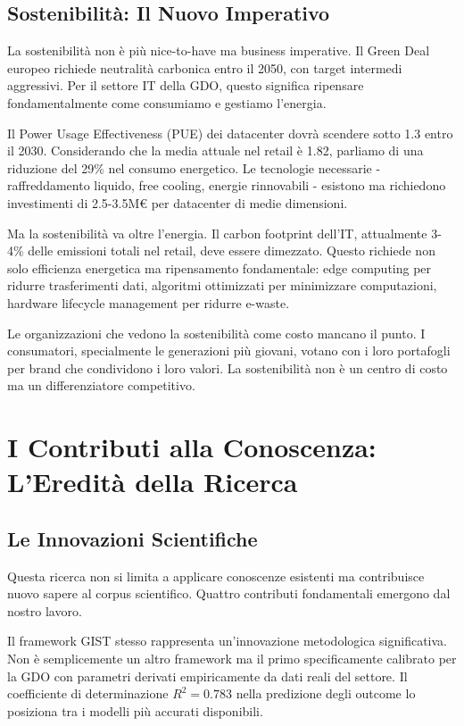 \subsection{Sostenibilità: Il Nuovo Imperativo}

La sostenibilità non è più nice-to-have ma business imperative. Il Green Deal europeo richiede neutralità carbonica entro il 2050, con target intermedi aggressivi. Per il settore IT della GDO, questo significa ripensare fondamentalmente come consumiamo e gestiamo l'energia.

Il Power Usage Effectiveness (PUE) dei datacenter dovrà scendere sotto 1.3 entro il 2030. Considerando che la media attuale nel retail è 1.82, parliamo di una riduzione del 29\% nel consumo energetico. Le tecnologie necessarie - raffreddamento liquido, free cooling, energie rinnovabili - esistono ma richiedono investimenti di 2.5-3.5M€ per datacenter di medie dimensioni.

Ma la sostenibilità va oltre l'energia. Il carbon footprint dell'IT, attualmente 3-4\% delle emissioni totali nel retail, deve essere dimezzato. Questo richiede non solo efficienza energetica ma ripensamento fondamentale: edge computing per ridurre trasferimenti dati, algoritmi ottimizzati per minimizzare computazioni, hardware lifecycle management per ridurre e-waste.

Le organizzazioni che vedono la sostenibilità come costo mancano il punto. I consumatori, specialmente le generazioni più giovani, votano con i loro portafogli per brand che condividono i loro valori. La sostenibilità non è un centro di costo ma un differenziatore competitivo.

\section{I Contributi alla Conoscenza: L'Eredità della Ricerca}

\subsection{Le Innovazioni Scientifiche}

Questa ricerca non si limita a applicare conoscenze esistenti ma contribuisce nuovo sapere al corpus scientifico. Quattro contributi fondamentali emergono dal nostro lavoro.

Il framework GIST stesso rappresenta un'innovazione metodologica significativa. Non è semplicemente un altro framework ma il primo specificamente calibrato per la GDO con parametri derivati empiricamente da dati reali del settore. Il coefficiente di determinazione $R^2 = 0.783$ nella predizione degli outcome lo posiziona tra i modelli più accurati disponibili\autocite{gartner2024market}.

